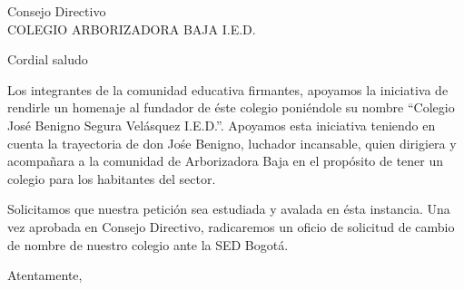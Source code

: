 \documentclass[letterpaper,spanish]{letter}
\date{23 de septiembre de 2016}
\begin{document}
\begin{letter}{Consejo Directivo\\COLEGIO ARBORIZADORA BAJA I.E.D.}
	
\opening{Cordial saludo}
Los integrantes de la comunidad educativa firmantes, apoyamos la iniciativa de rendirle un homenaje al fundador de éste colegio poniéndole su nombre ``Colegio José Benigno Segura Velásquez I.E.D.''. Apoyamos esta iniciativa teniendo en cuenta la trayectoria de don Jośe Benigno, luchador incansable, quien dirigiera y acompañara a la comunidad de Arborizadora Baja en el propósito de tener un colegio para los habitantes del sector.

Solicitamos que nuestra petición sea estudiada y avalada en ésta instancia. Una vez aprobada en Consejo Directivo, radicaremos un  oficio de solicitud de cambio de nombre de nuestro colegio ante la SED Bogotá.

\closing{Atentamente,}


\end{letter}
\end{document}
